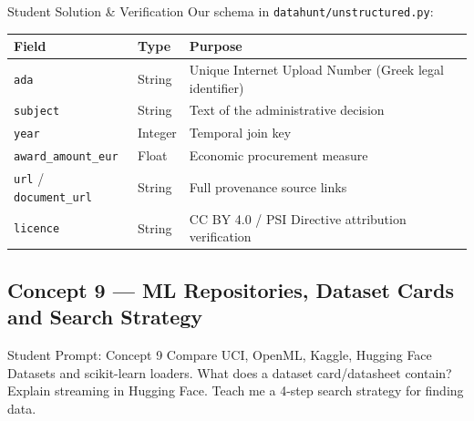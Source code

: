 \documentclass[11pt,a4paper]{article}
\begin{document}
\begin{evalbox}{Student Solution \& Verification}
Our schema in \texttt{datahunt/unstructured.py}:
\begin{center}\small
\begin{tabular}{lll}\toprule
\textbf{Field} & \textbf{Type} & \textbf{Purpose}\\\midrule
\texttt{ada} & String & Unique Internet Upload Number (Greek legal identifier)\\
\texttt{subject} & String & Text of the administrative decision\\
\texttt{year} & Integer & Temporal join key\\
\texttt{award\_amount\_eur} & Float & Economic procurement measure\\
\texttt{url} / \texttt{document\_url} & String & Full provenance source links\\
\texttt{licence} & String & CC BY 4.0 / PSI Directive attribution verification\\\bottomrule
\end{tabular}
\end{center}
\end{evalbox}

\subsection{Concept 9 --- ML Repositories, Dataset Cards and Search Strategy}
\begin{promptbox}{Student Prompt: Concept 9}
Compare UCI, OpenML, Kaggle, Hugging Face Datasets and scikit-learn loaders. What does a dataset card/datasheet contain? Explain streaming in Hugging Face. Teach me a 4-step search strategy for finding data.
\end{promptbox}
\end{document}
